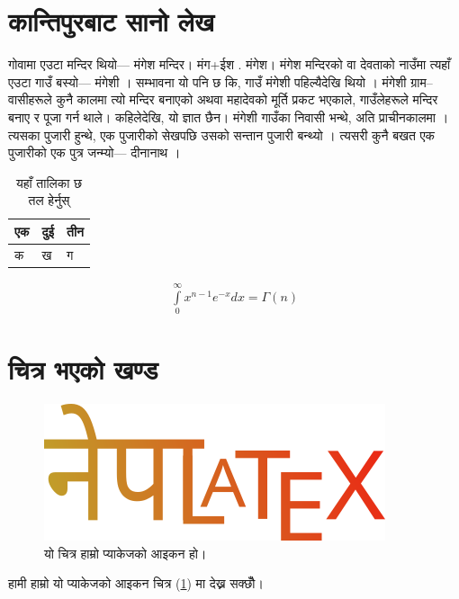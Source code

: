 \documentclass[a4paper]{article}
\begin{document}
    \section{कान्तिपुरबाट सानो लेख}
        गोवामा एउटा मन्दिर थियो— मंगेश मन्दिर। मंग+ईश . मंगेश। मंगेश मन्दिरको वा देवताको नाउँमा त्यहाँ एउटा गाउँ बस्यो— मंगेशी । सम्भावना यो पनि छ कि, गाउँ मंगेशी पहिल्यैदेखि थियो । मंगेशी ग्राम--वासीहरूले कुनै कालमा त्यो मन्दिर बनाएको अथवा महादेवको मूर्ति प्रकट भएकाले, गाउँलेहरूले मन्दिर बनाए र पूजा गर्न थाले। कहिलेदेखि, यो ज्ञात छैन। मंगेशी गाउँका निवासी भन्थे, अति प्राचीनकालमा । त्यसका पुजारी हुन्थे, एक पुजारीको सेखपछि उसको सन्तान पुजारी बन्थ्यो । त्यसरी कुनै बखत एक पुजारीको एक पुत्र जन्म्यो— दीनानाथ ।

        \begin{table}[h!]
            \centering
            \caption{यहाँ तालिका छ तल हेर्नुस्}
            \begin{tabular}{lll}
                एक & दुई & तीन \\
                \hline \hline
                क & ख & ग\\
                \hline
            \end{tabular}
        \end{table}
    
        \begin{align}
            \int\limits_0^\infty x^{n-1} e^{-x} dx = \Gamma(n)
        \end{align}
    \section{चित्र भएको खण्ड}

        \begin{figure}
            \centering
            \includegraphics[width=.60\linewidth]{../images/logo.png}
            \caption{यो चित्र हाम्रो प्याकेजको आइकन हो।}
            \label{fig:pkg-icn}
        \end{figure}
        हामी हाम्रो यो प्याकेजको आइकन चित्र (\ref{fig:pkg-icn}) मा देख्न सक्छौँ।
\end{document}
